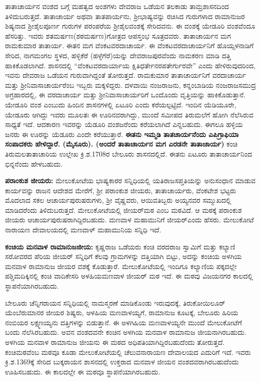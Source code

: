 ತಾತಾಚಾರ್ಯನ ವಂಶದ ಬಗ್ಗೆ ಮಹತ್ವದ ಅಂಶಗಳು ದೇವರಾಜ ಒಡೆಯನ ತಲಕಾಡು ತಾಮ್ರಶಾಸನದಿಂದ ತಿಳಿದುಬರುತ್ತದೆ. ತಾತಾಚಾರ್ಯ ಅಥವಾ ತಾತಪಾರ್ಯನು, ಶ‍್ರೀಭಾಷ್ಯವನ್ನು ರಚಿಸಿದ ಗುರುಗಳಾದ ರಾಮಾನುಜರ ಶಿಷ್ಯನಾದ ಶ‍್ರೀಶೈಲಪೂರ್ಣ ಗುರುಗಳ ಪರಂಪರೆಯ ಶ‍್ರೀಶೈಲವಂಶಕ್ಕೆ ಸೇರಿದವನು. ಈ ವಂಶಕ್ಕೆ ಯೇಡೂರಿ ವಂಶವೆಂದೂ ಹೆಸರಿತ್ತು. ಇವರು ಶತಮರ್ಷಣ(ಶಠಮರ್ಷಣ)ಗೋತ್ರದ ಆಪಸ್ತಂಭ ಸೂತ್ರದವರು. ತಾತಾಚಾರ್ಯನ ಮಗ ರಾಮಕುಮಾರ ತಾತಾರ್ಯ. ಈತನ ಮಗ ವೆಂಕಟವರದಾಚಾರ್ಯ. ಈ ವೆಂಕಟವರದಾಚಾರ್ಯನಿಗೆ ಹೊಯ್ಸಳನಾಡಿಗೆ ಸೇರಿದ, ನಾಗಮಂಗಲ ಸ್ಥಳದ, ಹಳ್ಳಿಕೆರೆ (ಹಳ್ಳೆಗೆರೆ)ಯನ್ನು ದೇವರಾಜಪುರವೆಂದು ನಾಮಕರಣ ಮಾಡಿ ದತ್ತಿ ಹಾಕಿಕೊಡಲಾಗಿದೆ. ಶಾಸನದಲ್ಲಿ “ವೆಂಕಟವರದಾರ್ಯಾಯ ಕ್ಷಿತಿಧರ್ತೇನರಪತೇರ್ಗುರವೇ” ಎಂದು ಹೇಳಿರುವುದರಿಂದ, ಇವನು ದೇವರಾಜ ಒಡೆಯನ ಗುರುವಾಗಿದ್ದಂತೆ ತೋರುತ್ತದೆ. ರಾಮಕುಮಾರ ತಾತಾಚಾರ್ಯನಿಗೆ ವರದಾಚಾರ್ಯ ಮತ್ತು ಶ‍್ರೀನಿವಾಸಾಚಾರ್ಯರೆಂಬ ಇಬ್ಬರು ಮಕ್ಕಳಿದ್ದರು. ದಳವಾಯಿ ನಂಜರಾಜನು, ಕನ್ನಂಬಾಡಿಯ ನಂಜರಾಜಸಮುದ್ರ ಅಗ್ರಹಾರದಲ್ಲಿ, ಈ ವರದಾಚಾರ್ಯ ಮತ್ತು ಶ‍್ರೀನಿವಾಸಾಚಾರ್ಯರಿಗೆ ಒಂದೊಂದು ವೃತ್ತಿಯನ್ನು ಹಾಕಿಕೊಡುತ್ತಾನೆ. ಯೇಡೂರಿ ವಂಶ ಎಂಬುದು ಹಿಂದಿನ ಶಾಸನಗಳಲ್ಲಿ ಏಟೂರಿ ಎಂದು ಕರೆಯಲ್ಪಟ್ಟಿದೆ. ಇಂದಿನ ಯೆಡಿಯೂರೇ, ಯೇಡೂರು ಆಗಿದ್ದು ಇವರು ಮೂಲತಃ ಈ ಊರಿನವರಾಗಿದ್ದು, ಮುಂದೆ ಸಮೀಪದ ತಿರುಮಲೆಗೆ ಹೋಗಿ ನೆಲೆಸಿರುವ ಸಾಧ್ಯತೆ ಇದೆ. ಆದಕಾರಣ ಇವರನ್ನು ಯೆಡೂರಿ ವಂಶಜರೆಂದು ಕರೆಯಲಾಗಿದೆ ಎನ್ನಬಹುದು. ಈಗಲೂ ಹಳ್ಳಿಯ ಜನರು ಈ ಊರನ್ನು ಯೆಡೂರು ಎಂದೇ ಕರೆಯುತ್ತಾರೆ. \textbf{ಈತನು ಇಮ್ಮಡಿ ತಾತಚಾರ್ಯನೆಂದು ಎಪಿಗ್ರಾಫಿಯಾ ಸಂಪಾದಕರು ಹೇಳಿದ್ದಾರೆ. (ಮೈಸೂರು). (ಅಂದರೆ ತಾತಾಚಾರ್ಯನ ಮಗ ಎರಡನೇ ತಾತಾಚಾರ್ಯ)} ಕಂಚಿ ತಿರುಮಲತಾತಾಚಾರಿಯ ಉಲ್ಲೇಖ ಕ್ರಿ.ಶ.1708ರ ಬೇಲೂರು ಶಾಸನದಲ್ಲಿದೆ. ಈತನು ಏಟೂರು ತಾತಾಚಾರ್ಯನಿಂದ ಭಿನ್ನನೆಂದು ಹೇಳಬಹುದು.

\textbf{ಪರಾಂಕುಶ ಜೀಯರು:} ಮೇಲುಕೋಟೆಯ ಭಾಷ್ಯಕಾರರ ಸನ್ನಿಧಿಯಲ್ಲಿ ಯತಿರಾಜಸಪ್ತತಿಯನ್ನು ಅನುಸಂಧಾನ ಮಾಡುವ ಕಾರ್ಯವನ್ನು ರಾಜನ ಆದೇಶದ ಮೇರೆಗೆ, ಶ‍್ರೀ ಪರಾಂಕುಶ ಜೀಯರು, ತಾತಾಚಾರ್ಯರು, ವೆಂಕಟೇಶ ಭಟ್ಟರು ಮೊದಲಾದ ಸಕಲ ಆಚಾರ್ಯಪುರುಷರುಗಳು, ಶ‍್ರೀ ವೈಷ್ಣವರು, ಆಯಿವತಿಬ್ಬರು ಅಯ್ಯನವರ ಸಮ್ಮುಖದಲ್ಲಿ ಮಾಡಿದರೆಂದು ತಿಳಿದುಬರುತ್ತದೆ. ಮೇಲುಕೋಟೆಯಲ್ಲಿ ಜೀಯರ್​ಮಠ ಎಂಬ ಮಠವಿದೆ. ಆ ಮಠಕ್ಕೆ ಪರಾಂಕುಶ ಜೀಯರು ಆಚಾರ್ಯಪುರುಷರಾಗಿದ್ದಿರಬಹುದು. ಮಣವಾಳ ಮಹಾಮುನಿಗೆ ಜೀಯರ್​ ಎಂದು ಹೆಸರು. ಮೇಲುಕೋಟೆ ನಾರಾಯಣ ದೇವಾಲಯದಲ್ಲಿ ಮಣವಾಳ್​ ಮಹಾಮುನಿಯ ಸನ್ನಿಧಿ ಇದೆ. 

\textbf{ಕಂಚಿಯ ಮನವಾಳ ರಾಮಾನುಜಜೀಯ: } ಕೃಷ್ಣರಾಜ ಒಡೆಯರು ಕಂಚಿ ವರದರಾಜ ಸ್ವಾಮಿಗೆ ಮತ್ತು ಕಲ್ಯಾಣಿ ಸರೋವರದ ಪೆರಿಯ ಜೀಯರ್​ ಸನ್ನಿಧಿಗೆ ಕೆಲವು ಗ್ರಾಮಗಳನ್ನು ದತ್ತಿಯಾಗಿ ಬಿಟ್ಟು, ಅದನ್ನು ಕಂಚಿಯ ಅಳಗಿಯ ಮನವಾಳ ರಾಮಾನುಜ ಜೀಯರ ವಶಕ್ಕೆ ಕೊಡುತ್ತಾರೆ.  ಮೇಲುಕೋಟೆಯಲ್ಲಿ ಇಂದಿಗೂ ಕಲ್ಯಾಣಿಯ ಪಕ್ಕದಲ್ಲೇ ಪಶ್ಚಿಮದಿಕ್ಕಿನಲ್ಲಿ ಕಂಚಿ ವಾದಿಕೇಸರಿ ಅಳಹಿಯಮಣವಾಳ ಜೀಯರ್​ ಮಠ ಇದೆ. ಈ ಮಠವು ವಿಜಯನಗರ ಕಾಲದಲ್ಲಿ ಸ್ಥಾಪನೆಯಾಗಿರಬಹುದು.

ಬೇಲೂರು ಚೆನ್ನಿಗರಾಯನ ಸನ್ನಿಧಿಯಲ್ಲಿ ನಾಮಸ್ಮರಣೆ ಮಾಡಿಕೊಂಡು ಇರುವುದಕ್ಕೆ, ತಿರುಕೋಯಿಲೂರ್​ ಯೆಂಬೆರುಮಾನರ ಜೀಯರ ಶಿಷ್ಯರು, ಅಳಹಿಯ ಮಣವಾಳಯ್ಯಗೆ, ರಾಮಾನುಜ ಕೂಟಕ್ಕೆ, ಬೇಲೂರು ಹಿರಿಯ ನಂಬಿಯರ ಲಕ್ಷ್ಮಣಯ್ಯನು ದತ್ತಿಗಳನ್ನು ಬಿಡುತ್ತಾನೆ. ಈ ಅಳಗಿಹಿಯ ಮಣವಾಳಯ್ಯನೇ ಮುಂದೆ ಮೇಲುಕೋಟೆಗೆ ಬಂದು ನೆಲೆಸಿರಬಹುದು. ಅವನ ವಂಶದವನೇ ಕಂಚಿನ ಅಳಗಿಯ ಮನವಾಳ ರಾಮಾನುಜ ಜೀಯನಾಗಿರಬಹುದು. ಅಳಗಿಯ ಮನವಾಳ ರಾಮಾನುಜ ಜೀಯನು ಈ ಮಠದ ಅಧಿಪತಿಯಾಗಿದ್ದಿರಬಹುದೆಂದು ತೋರುತ್ತದೆ. ಕಂಚಿಮಠವೆಂಬ ಮಠವೂ ಕೂಡಾ ಮೇಲುಕೋಟೆಯಲ್ಲಿ ಚೆಲುವನಾರಾಯಣ ದೇವಾಲಯದ ಎದುರಿಗೆ ಇದೆ. ಇವರು ಕ್ರಿ.ಶ.1369ಕ್ಕೆ ಸೇರಿದ ಬುಕ್ಕರಾಯನ ಶಾಸನದಲ್ಲಿ ಉಕ್ತರಾದ ಮನವಾಳ ಜೀಯನ ವಂಶದವರಾಗಿರಬಹುದೆಂದು ಊಹಿಸಬಹುದು. ಈ ಕಾಲದಲ್ಲೇ ಈ ಮಠವೂ ಸ್ಥಾಪನೆಯಾಗಿರಬಹುದು.

